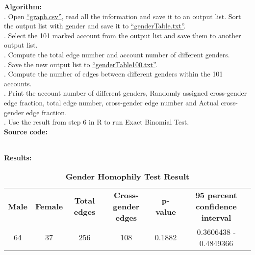 \documentclass{article}
\begin{document}
		\textbf{Algorithm:}\\
		. Open \href{https://github.com/zhangboroy/cs532-s17/blob/master/assg06_submission/graph.csv}{``graph.csv''}, read all the information and save it to an output list. Sort the output list with gender and save it to \href{https://github.com/zhangboroy/cs532-s17/blob/master/assg06_submission/genderTable.txt}{``genderTable.txt''}.\\
		. Select the 101 marked account from the output list and save them to another output list.\\
		. Compute the total edge number and account number of different genders.\\
		. Save the new output list to \href{https://github.com/zhangboroy/cs532-s17/blob/master/assg06_submission/genderTable100.txt}{``genderTable100.txt''}.\\
		. Compute the number of edges between different genders within the 101 accounts.\\
		. Print the account number of different genders, Randomly assigned cross-gender edge fraction, total edge number, cross-gender edge number and Actual cross-gender edge fraction.\\
		. Use the result from step 6 in R to run Exact Binomial Test.\\

		\noindent\textbf{Source code:}
		
		

		\noindent\\\textbf{Results: }
		
		
		\begin{table}[!htb]
			\centering
			\caption{\textbf{Gender Homophily Test Result}}
			\begin{tabular}{cccccc}
				\toprule
				\textbf{Male} & \textbf{Female} & \textbf{Total edges} & \textbf{Cross-gender edges} & \textbf{p-value} & \textbf{95 percent confidence interval}\\
				64 & 37 & 256 & 108 & 0.1882 & 0.3606438 - 0.4849366\\
				\bottomrule
			\end{tabular}
		\end{table}
\end{document}
